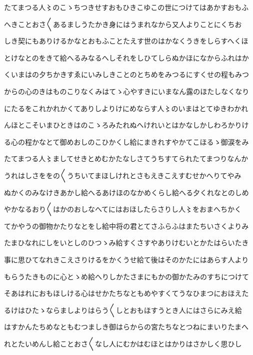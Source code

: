 \documentclass[a4paper,11pt,landscape]{ltjtarticle}
\begin{document}
\par\medskip
たてまつる人〻のこゝちつきせすおもひきこゆこの世につけてはあかすおもふ
\par\medskip
へきことおさ〱あるましうたかき身にはうまれなから又人よりことにくちお
\par\medskip
しき契にもありけるかなとおもふことたえす世のはかなくうきをしらすへくほ
\par\medskip
とけなとのをきて給へるみなるへしそれをしひてしらぬかほになからふれはか
\par\medskip
くいまはの夕ちかきすゑにいみしきことのとちめをみつるにすくせの程もみつ
\par\medskip
からの心のきはものこりなくみはてゝ心やすきにいまなん露のほたしなくなり
\par\medskip
にたるをこれかれかくてありしよりけにめならす人〻のいまはとてゆきわかれ
\par\medskip
んほとこそいまひときはのこゝろみたれぬへけれいとはかなしかしわろかりけ
\par\medskip
る心の程かなとて御めおしのこひかくし給にまきれすやかてこほるゝ御涙をみ
\par\medskip
たてまつる人〻ましてせきとめむかたなしさてうちすてられたてまつりなんか
\par\medskip
うれはしさををの〱うちいてまほしけれとさもえきこえすむせかへりてやみ
\par\medskip
ぬかくのみなけきあかし給へるあけほのなかめくらし給へる夕くれなとのしめ
\par\medskip
やかなるおり〱はかのおしなへてにはおほしたらさりし人〻をおまへちかく
\par\medskip
てかやうの御物かたりなとをし給中将の君とてさふらふはまたちいさくよりみ
\par\medskip
たまひなれにしをいとしのひつゝみ給すくさすやありけむいとかたはらいたき
\par\medskip
事に思ひてなれきこえさりけるをかくうせ給て後はそのかたにはあらす人より
\par\medskip
もらうたきものに心とゝめ給へりしかたさまにもかの御かたみのすちにつけて
\par\medskip
そあはれにおもほしける心はせかたちなともめやすくてうなひまつにおほえた
\par\medskip
るけはひたゝならましよりはらう〱しとおもほすうとき人にはさらにみえ給
\par\medskip
はすかんたちめなともむつましき御はらからの宮たちなとつねにまいりたまへ
\par\medskip
れとたいめんし給ことおさ〱なし人にむかはむほとはかりはさかしく思ひし
\par\medskip
\end{document}
